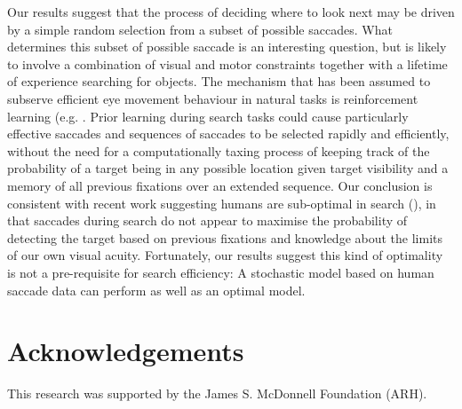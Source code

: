 \documentclass[preprint, authoryear]{elsarticle} %
\begin{document}
\par

Our results suggest that the process of deciding where to look next may be driven by a simple random selection from a subset of possible saccades. What determines this subset of possible saccade is an interesting question, but is likely to involve a combination of visual and motor constraints together with a lifetime of experience searching for objects. The mechanism that has been assumed to subserve efficient eye movement behaviour in natural tasks is reinforcement learning (e.g. \citep{hayhoe2014}. Prior learning during search tasks could cause particularly effective saccades and sequences of saccades to be selected rapidly and efficiently, without the need for a computationally taxing process of keeping track of the probability of a target being in any possible location given target visibility and a memory of all previous fixations over an extended sequence. Our conclusion is consistent with recent work suggesting humans are sub-optimal in search (\cite{morvan2012, verghese2012, zhang2012}), in that saccades during search do not appear to maximise the probability of detecting the target based on previous fixations and knowledge about the limits of our own visual acuity. Fortunately, our results suggest this kind of optimality is not a pre-requisite for search efficiency: A stochastic model based on human saccade data can perform as well as an optimal model.

\section*{Acknowledgements}
This research was supported by the James S. McDonnell Foundation (ARH).




\end{document}
